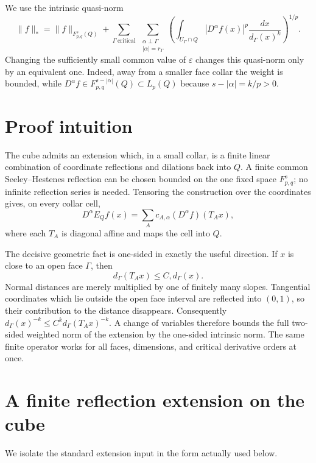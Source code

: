 \documentclass[11pt]{article}
\begin{document}
We use the intrinsic quasi-norm
\begin{equation}\label{eq:star-norm}
 \|f\|_*=\|f\|_{F_{p,q}^s(Q)}+
 \sum_{\Gamma\ \mathrm{critical}}\ \sum_{\substack{\alpha\perp\Gamma\\
 |\alpha|=r_\Gamma}}
 \left(\int_{U_\Gamma\cap Q}|D^\alpha f(x)|^p
 \frac{dx}{d_\Gamma(x)^k}\right)^{1/p}.
\end{equation}
Changing the sufficiently small common value of $\varepsilon$ changes this
quasi-norm only by an equivalent one.  Indeed, away from a smaller face
collar the weight is bounded, while
$D^\alpha f\in F_{p,q}^{s-|\alpha|}(Q)\subset L_p(Q)$ because
$s-|\alpha|=k/p>0$.

\section{Proof intuition}

The cube admits an extension which, in a small collar, is a finite linear
combination of coordinate reflections and dilations back into $Q$.  A
finite common Seeley--Hestenes reflection can be chosen bounded on the one
fixed space $F_{p,q}^s$; no infinite reflection series is needed.
Tensoring the construction over the coordinates gives, on every collar
cell,
\[
 D^\alpha E_Qf(x)=\sum_A c_{A,\alpha}(D^\alpha f)(T_Ax),
\]
where each $T_A$ is diagonal affine and maps the cell into $Q$.

The decisive geometric fact is one-sided in exactly the useful direction.
If $x$ is close to an open face $\Gamma$, then
\[
 d_\Gamma(T_Ax)\le C,d_\Gamma(x).
\]
Normal distances are merely multiplied by one of finitely many slopes.
Tangential coordinates which lie outside the open face interval are
reflected into $(0,1)$, so their contribution to the distance disappears.
Consequently
$d_\Gamma(x)^{-k}\le C^k d_\Gamma(T_Ax)^{-k}$.  A change of variables
therefore bounds the full two-sided weighted norm of the extension by the
one-sided intrinsic norm.  The same finite operator works for all faces,
dimensions, and critical derivative orders at once.

\section{A finite reflection extension on the cube}

We isolate the standard extension input in the form actually used below.
\end{document}
